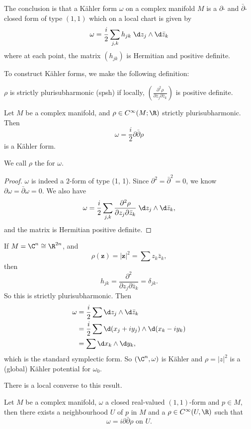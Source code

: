 \documentclass[a4paper]{article}
\begin{document}
The conclusion is that a K\"ahler form $\omega$ on a complex manifold $M$ is a $\partial$- and $\bar{\partial}$-closed form of type $(1, 1)$ which on a local chart is given by
\[
  \omega = \frac{i}{2} \sum_{j, k} h_{jk} \;\d z_j \wedge \d \bar{z}_k
\]
where at each point, the matrix $(h_{jk})$ is Hermitian and positive definite.

To construct K\"ahler forms, we make the following definition:
\begin{defi}
  $\rho$ is strictly plurisubharmonic (spsh) if locally, $\left(\frac{\partial^2 \rho}{\partial z_j \partial \bar{z}_k}\right)$ is positive definite.
\end{defi}
\begin{prop}
  Let $M$ be a complex manifold, and $\rho \in C^\infty(M; \R)$ strictly plurisubharmonic. Then
  \[
    \omega = \frac{i}{2} \partial \bar{\partial} \rho
  \]
  is a K\"ahler form.
\end{prop}
We call $\rho$ the  for $\omega$.
\begin{proof}
  $\omega$ is indeed a $2$-form of type (1, 1). Since $\partial^2 = \bar{\partial}^2 = 0$, we know $\partial \omega = \bar{\partial} \omega = 0$. We also have
  \[
    \omega = \frac{i}{2} \sum_{j, k} \frac{\partial^2 \rho}{\partial z_j \partial \bar{z}_k}\;\d z_j\wedge \d \bar{z}_k,
  \]
  and the matrix is Hermitian positive definite.
\end{proof}

\begin{eg}
  If $M = \C^n \cong \R^{2n}$, and
  \[
    \rho(\mathbf{z}) = |\mathbf{z}|^2 = \sum z_k \bar{z}_k,
  \]
  then
  \[
    h_{jk} = \frac{\partial^2}{\partial z_j \partial \bar{z}_k} = \delta_{jk}.
  \]
  So this is strictly plurisubharmonic. Then
  \begin{align*}
    \omega &= \frac{i}{2} \sum \d z_j \wedge \d \bar{z}_k \\
    &= \frac{i}{2} \sum \d (x_j + i y_j) \wedge \d (x_k - i y_k)\\
    &= \sum \d x_k \wedge \d y_k,
  \end{align*}
  which is the standard symplectic form. So $(\C^n, \omega)$ is K\"ahler and $\rho = |z|^2$ is a (global) K\"ahler potential for $\omega_0$.
\end{eg}

There is a local converse to this result.

\begin{prop}
  Let $M$ be a complex manifold, $\omega$ a closed real-valued $(1, 1)$-form and $p \in M$, then there exists a neighbourhood $U$ of $p$ in $M$ and a $\rho \in C^\infty(U, \R)$ such that
  \[
    \omega = i \partial \bar{\partial} \rho\text{ on }U.
  \]
\end{prop}
\end{document}
